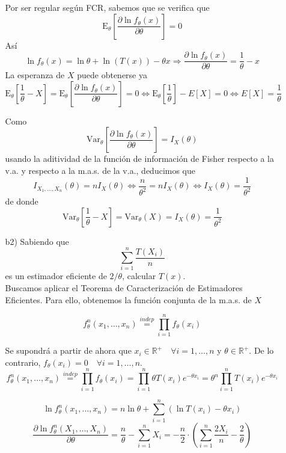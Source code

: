 \documentclass[12pt]{article}
\newcommand{\E}{\mathrm{E}}
\newcommand{\V}{\mathrm{Var}}
\newcommand{\R}{\mathbb{R}}
\newcommand{\Rmas}{\R^{+}}
\begin{document}
\begin{ejercicio}
\begin{enumerate}
\begin{enumerate}
                Por ser regular según FCR, sabemos que se verifica que $$\E_\theta \left[\dfrac{\partial \ln f_\theta(x)}{\partial \theta}\right] = 0$$
                Así
                $$\ln f_\theta(x) = \ln \theta + \ln (T(x)) - \theta x \Longrightarrow \dfrac{\partial \ln f_\theta(x)}{\partial \theta} = \dfrac{1}{\theta} - x$$
                La esperanza de $X$ puede obtenerse ya
                $$\E_\theta \left[\dfrac{1}{\theta} - X \right] = \E_\theta \left[\dfrac{\partial \ln f_\theta(x)}{\partial \theta}\right] = 0 
                \iff \E_\theta \left[\dfrac{1}{\theta} \right] - E[X] = 0 \iff E[X] = \dfrac{1}{\theta}$$
                
                Como $$\V_\theta \left[ \dfrac{\partial \ln f_\theta(x)}{\partial \theta} \right] = I_X(\theta)$$ usando la aditividad de la función de información de Fisher respecto a la v.a. y respecto a la m.a.s. de la v.a., 
                deducimos que $$I_{X_1, \ldots, X_n}(\theta) = n I_X(\theta) \iff \dfrac{n}{\theta^2} = n I_X(\theta) \iff I_X(\theta) = \dfrac{1}{\theta^2}$$
                de donde 
                $$\V_\theta \left[ \dfrac{1}{\theta} - X \right] = \V_\theta(X) = I_X(\theta) = \dfrac{1}{\theta^2}$$

                \item[b2)] Sabiendo que $$\sum_{i=1}^n \dfrac{T(X_i)}{n}$$ es un estimador eficiente de $2/\theta$, calcular $T(x)$. \\
                
                Buscamos aplicar el Teorema de Caracterización de Estimadores Eficientes. Para ello, obtenemos la función conjunta de la m.a.s. de $X$

                $$f_\theta^n(x_1, \ldots, x_n) \stackrel{indep}{=} \prod_{i=1}^n f_\theta(x_i)$$

                Se supondrá a partir de ahora que $x_i \in \Rmas \quad \forall i=1,\ldots,n$ y $\theta \in \Rmas$. De lo contrario, $f_\theta(x_i) = 0 \quad \forall i = 1, \ldots, n$.
                $$f_\theta^n(x_1, \ldots, x_n) \stackrel{indep}{=} \prod_{i=1}^n f_\theta(x_i) = \prod_{i=1}^n \theta T(x_i)e^{-\theta x_i} = \theta^n \prod_{i=1}^n T(x_i)e^{-\theta x_i}$$ 

                $$\ln f_{\theta}^n (x_1, \ldots, x_n) = n \ln \theta + \sum_{i=1}^n (\ln T(x_i) - \theta x_i)$$
                $$\dfrac{\partial \ln f_{\theta}^n (X_1, \ldots, X_n)}{\partial \theta} = \dfrac{n}{\theta} - \sum_{i=1}^n X_i = -\dfrac{n}{2} \cdot \left( \sum_{i=1}^n \dfrac{2X_i}{n} - \dfrac{2}{\theta} \right)$$


\end{enumerate}
\end{enumerate}
\end{ejercicio}
\end{document}
